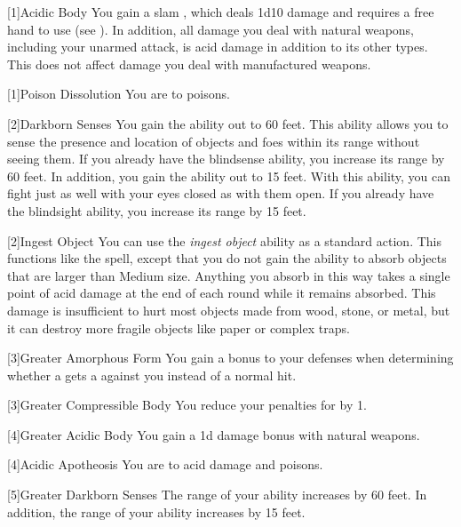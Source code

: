             [1]{Acidic Body} You gain a slam , which deals 1d10 damage and requires a free hand to use (see ).
            In addition, all damage you deal with natural weapons, including your unarmed attack, is acid damage in addition to its other types.
            This does not affect damage you deal with manufactured weapons.

            [1]{Poison Dissolution} You are  to poisons.

            [2]{Darkborn Senses} You gain the  ability out to 60 feet.
            This ability allows you to sense the presence and location of objects and foes within its range without seeing them.
            If you already have the blindsense ability, you increase its range by 60 feet.
            In addition, you gain the  ability out to 15 feet.
            With this ability, you can fight just as well with your eyes closed as with them open.
            If you already have the blindsight ability, you increase its range by 15 feet.

            [2]{Ingest Object} You can use the \textit{ingest object} ability as a standard action.
            This functions like the  spell, except that you do not gain the ability to absorb objects that are larger than Medium size.
            Anything you absorb in this way takes a single point of acid damage at the end of each round while it remains absorbed.
            This damage is insufficient to hurt most objects made from wood, stone, or metal, but it can destroy more fragile objects like paper or complex traps.

            [3]{Greater Amorphous Form} You gain a  bonus to your defenses when determining whether a  gets a  against you instead of a normal hit.

            [3]{Greater Compressible Body} You reduce your penalties for \squeezing by 1.

            [4]{Greater Acidic Body} You gain a \plus1d damage bonus with natural weapons.

            [4]{Acidic Apotheosis} You are  to acid damage and poisons.

            [5]{Greater Darkborn Senses} The range of your  ability increases by 60 feet.
            In addition, the range of your  ability increases by 15 feet.

